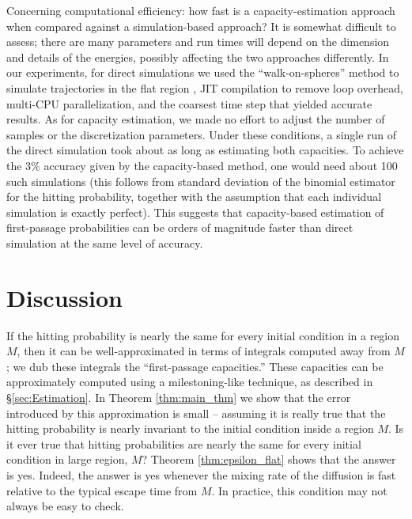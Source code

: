 \documentclass[12pt, nofootinbib,english, amsmath, amssymb, aps, priprint, graphicx,floatfix]{revtex4-1}
\theoremstyle{plain}
\theoremstyle{definition}
\theoremstyle{plain}
\begin{document}
Concerning computational efficiency: how fast is a capacity-estimation approach when compared against a simulation-based approach?  It is somewhat difficult to assess; there are many parameters and run times will depend on the dimension and details of the energies, possibly affecting the two approaches differently. In our experiments, for direct simulations we used the ``walk-on-spheres'' method to simulate trajectories in the flat region \cite{bingham1972random}, JIT compilation to remove loop overhead, multi-CPU parallelization, and the coarsest time step that yielded accurate results. As for capacity estimation, we made no effort to adjust the number of samples or the discretization parameters. Under these conditions, a single run of the direct simulation took about as long as estimating both capacities.  To achieve the 3\% accuracy given by the capacity-based method, one would need about 100 such simulations (this follows from standard deviation of the binomial estimator for the hitting probability, together with the assumption that each individual simulation is exactly perfect). This suggests that capacity-based estimation of first-passage probabilities can be orders of magnitude faster than direct simulation at the same level of accuracy.





\section{Discussion}
\label{sec:Discussion}

If the hitting probability is nearly the same for every initial condition in a region $M$, then it can be well-approximated in terms of integrals computed away from $M$; we dub these integrals the ``first-passage capacities.''  These capacities can be approximately computed using a milestoning-like technique, as described in \S\ref{sec:Estimation}.  In Theorem \ref{thm:main_thm} we show that the error introduced by this approximation is small -- assuming it is really true that the hitting probability is nearly invariant to the initial condition inside a region $M$.  Is it ever true that hitting probabilities are nearly the same for every initial condition in large region, $M$?  Theorem \ref{thm:epsilon_flat} shows that the answer is yes.  Indeed, the answer is yes whenever the mixing rate of the diffusion is fast relative to the typical escape time from $M$.  In practice, this condition may not always be easy to check.
\end{document}
